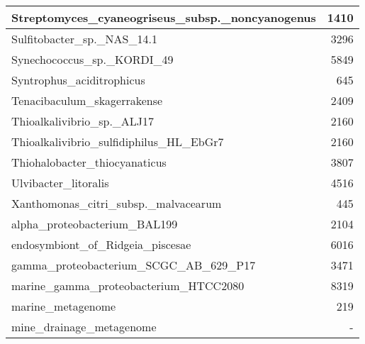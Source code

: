 \documentclass[12pt,a4paper]{article}
\begin{document}
\begin{table}[ht]
\begin{center}
\begin{tabular}{|l*{1}{|r}|}
Streptomyces\_cyaneogriseus\_subsp.\_noncyanogenus & 1410 \\ \hline
Sulfitobacter\_sp.\_NAS\_14.1 & 3296 \\ \hline
Synechococcus\_sp.\_KORDI\_49 & 5849 \\ \hline
Syntrophus\_aciditrophicus & 645 \\ \hline
Tenacibaculum\_skagerrakense & 2409 \\ \hline
Thioalkalivibrio\_sp.\_ALJ17 & 2160 \\ \hline
Thioalkalivibrio\_sulfidiphilus\_HL\_EbGr7 & 2160 \\ \hline
Thiohalobacter\_thiocyanaticus & 3807 \\ \hline
Ulvibacter\_litoralis & 4516 \\ \hline
Xanthomonas\_citri\_subsp.\_malvacearum & 445 \\ \hline
alpha\_proteobacterium\_BAL199 & 2104 \\ \hline
endosymbiont\_of\_Ridgeia\_piscesae & 6016 \\ \hline
gamma\_proteobacterium\_SCGC\_AB\_629\_P17 & 3471 \\ \hline
marine\_gamma\_proteobacterium\_HTCC2080 & 8319 \\ \hline
marine\_metagenome & 219 \\ \hline
mine\_drainage\_metagenome & - \\ \hline
\end{tabular}
\end{center}
\end{table}
\end{document}
